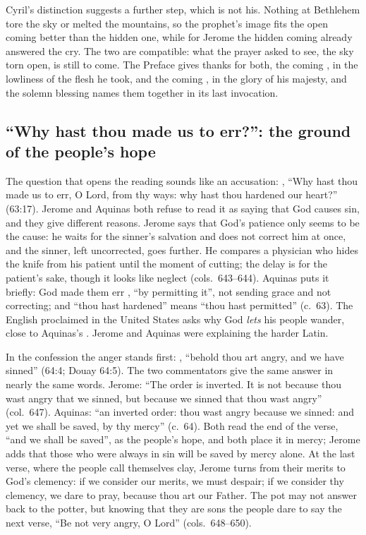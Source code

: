 Cyril's distinction suggests a further step, which is not his. Nothing at
Bethlehem tore the sky or melted the mountains, so the prophet's image fits
the open coming better than the hidden one, while for Jerome the hidden coming
already answered the cry. The two are compatible: what the prayer asked to
see, the sky torn open, is still to come. The Preface gives thanks for both,
the coming , in the lowliness of the
flesh he took, and the coming , in the glory
of his majesty, and the solemn blessing names them together in its
last invocation.

\subsection{``Why hast thou made us to err?'': the ground of the people's hope}

The question that opens the reading sounds like an accusation:
, ``Why hast thou made us to err, O Lord, from thy ways: why hast
thou hardened our heart?'' (63:17). Jerome and Aquinas both refuse to read it
as saying that God causes sin, and they give different reasons. Jerome says
that God's patience only seems to be the cause: he waits for the sinner's
salvation and does not correct him at once, and the sinner, left uncorrected,
goes further. He compares a physician who hides the knife from his patient
until the moment of cutting; the delay is for the patient's sake, though it
looks like neglect (cols.~643--644). Aquinas puts it briefly: God made
them err , ``by permitting it'', not sending grace and not
correcting; and ``thou hast hardened'' means ``thou hast permitted'' (c.~63).
The English proclaimed in the United States asks why God \emph{lets} his
people wander, close to Aquinas's . Jerome and Aquinas were
explaining the harder Latin.

In the confession the anger stands first: , ``behold thou art angry, and we have sinned'' (64:4; Douay 64:5).
The two commentators give the same answer in nearly the same words. Jerome:
``The order is inverted. It is not because thou wast angry that we sinned, but
because we sinned that thou wast angry'' (col.~647). Aquinas: ``an inverted
order: thou wast angry because we sinned: and yet we shall be saved, by thy
mercy'' (c.~64). Both read the end of the verse, ``and we shall be saved'', as
the people's hope, and both place it in mercy; Jerome adds that those who were
always in sin will be saved by mercy alone. At the last verse, where the
people call themselves clay, Jerome turns from their merits to God's
clemency: if we consider our merits, we must despair; if we consider thy
clemency, we dare to pray, because thou art our Father. The pot may not answer
back to the potter, but knowing that they are sons the people dare to say the
next verse, ``Be not very angry, O Lord'' (cols.~648--650).

